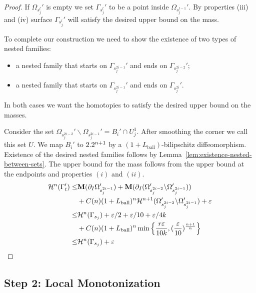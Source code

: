 \begin{lemma}
\begin{proof}
        If $\Omega_{s_j^l}'$ is empty we set $\Gamma_{s_j^l}'$ to be a point inside $\Omega_{s_j^{l - 1}}'$. By properties (iii) and (iv) surface $\Gamma_{s_j^l}'$ will satisfy the desired upper bound on the mass.

        To complete our construction we need to show the existence of two types of nested families:
        \begin{itemize}
            \item a nested family that starts on $\Gamma_{s_j^{2i - 1}}'$ and ends on $\Gamma_{s_j^{2i - 2}}'$;
            \item a nested family that starts on $\Gamma_{s_j^{2i - 1}}'$ and ends on $\Gamma_{s_j^{2i}}'$.
        \end{itemize}
        In both cases we want the homotopies to satisfy the desired upper bound on the masses.

        Consider the set $\Omega_{s_j^{2i - 2}}'\backslash\Omega_{s_j^{2i - 1}}' = B_i'\cap U_j^1$. After smoothing the corner we call this set $U$. We map $B_i'$ to $2.2^{n + 1}$ by a $(1 + L_{\mathrm{ball}})$-bilipschitz diffeomorphism. Existence of the desired nested families follows by Lemma~\ref{lem:existence-nested-between-sets}. The upper bound for the mass follows from the upper bound at the endpoints and properties $(i)$ and $(ii)$.
        \begin{equation*}
            \begin{split}
                \mathcal{H}^n(\Gamma_t') \leq& \mathbf{M}(\partial_I\Omega_{s_j^{2i - 1}}') + \mathbf{M}(\partial_I(\Omega_{s_j^{2i - 2}}'\backslash\Omega_{s_j^{2i - 1}}'))\\
                &+ C(n)(1 + L_{\mathrm{ball}})^n\mathcal{H}^{n + 1}(\Omega_{s_j^{2i - 2}}'\backslash\Omega_{s_j^{2i - 1}}') + \varepsilon\\
                \leq& \mathcal{H}^n(\Gamma_{s_j}) + \varepsilon/2 + \varepsilon/10 + \varepsilon/4k\\
                &+ C(n)(1 + L_{\mathrm{ball}})^n\min\left\{\frac{r\varepsilon}{10k}, (\frac{\varepsilon}{10})^{\frac{n + 1}{n}}\right\}\\
                \leq& \mathcal{H}^n(\Gamma_{s_j}) + \varepsilon
            \end{split}
        \end{equation*}
    \end{proof}
\end{lemma}
\subsection{Step 2: Local Monotonization}\label{sec:local-monotonization}

